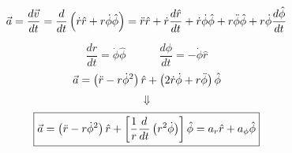 \begin{equation}
    \vec a = \frac{d\vec v}{dt} = \frac{d}{dt}\left( \dot r \hat r +
    r\dot\phi\hat\phi \right) = \ddot r\hat r + \dot r\frac{d\hat r}{dt} +
    \dot r \dot \phi \hat\phi + r\ddot\phi\hat\phi + r\dot\phi\frac{d\hat \phi}{dt}
\end{equation}
\begin{equation}
    \frac{d\hat r}{dt} = \dot\phi\hat\phi\quad\quad\quad
    \frac{d\hat \phi}{dt} = -\dot\phi\hat r
\end{equation}
\begin{equation}
    \vec a = \left( \ddot r - r\dot\phi^2\right)\hat r + \left( 2\dot r\dot\phi +
    r\ddot\phi\right)\hat\phi
\end{equation}
$$\Downarrow$$
\begin{equation}
    \boxed{\vec a = \left( \ddot r - r\dot\phi^2\right)\hat r +
    \left[\frac{1}{r}\frac{d}{dt} \left( r^2\dot\phi\right)\right]\hat\phi =
    a_r\hat r + a_{\phi}\hat\phi}
\label{eq:polaris_a}
\end{equation}
